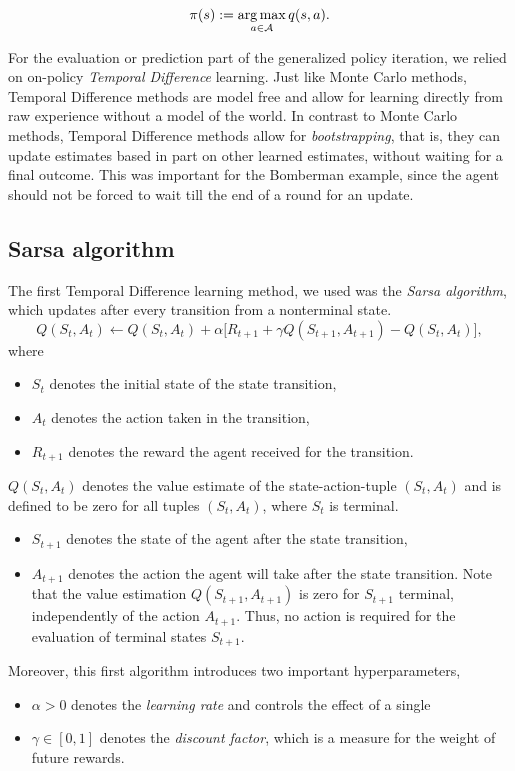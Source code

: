 \begin{equation} \label{eq:greedy_policy_update}
	\pi(s) := \operatorname*{arg\,max}_{a \in \mathcal{A}} q(s, a).
\end{equation}

For the evaluation or prediction part of the generalized policy iteration, we relied on on-policy \emph{Temporal Difference} learning. Just like Monte Carlo methods, Temporal Difference methods are model free and allow for learning directly from raw experience without a model of the world. In contrast to Monte Carlo methods, Temporal Difference methods allow for \emph{bootstrapping}, that is, they can update estimates based in part on other learned estimates, without waiting for a final outcome. This was important for the Bomberman example, since the agent should not be forced to wait till the end of a round for an update.

\subsection{Sarsa algorithm}

The first Temporal Difference learning method, we used was the \emph{Sarsa algorithm}, which updates after every transition from a nonterminal state.  \\
\begin{equation} \label{eq:sarsa_update}
	Q(S_t, A_t) \leftarrow Q(S_t, A_t) + \alpha \big[R_{t+1} + \gamma Q(S_{t+1}, A_{t+1}) - Q(S_t, A_t)\big],
\end{equation}
where
\begin{itemize}
	\item $S_t$ denotes the initial state of the state transition,
	\item $A_t$ denotes the action taken in the transition,
	\item $R_{t+1}$ denotes the reward the agent received for the transition.
\end{itemize}
$Q(S_t, A_t)$ denotes the value estimate of the state-action-tuple $(S_t, A_t)$ and is defined to be zero for all tuples $(S_t, A_t)$, where $S_t$ is terminal.
\begin{itemize}
	\item $S_{t+1}$ denotes the state of the agent after the state transition,
	\item $A_{t+1}$ denotes the action the agent will take after the state transition. Note that the value estimation $Q(S_{t+1}, A_{t+1})$ is zero for $S_{t+1}$ terminal, independently of the action $A_{t+1}$. Thus, no action is required for the evaluation of terminal states $S_{t+1}$. 
\end{itemize}
Moreover, this first algorithm introduces two important hyperparameters,
\begin{itemize}
	\item $\alpha > 0$ denotes the \emph{learning rate} and controls the effect of a single 
	\item $\gamma \in [0, 1]$ denotes the \emph{discount factor}, which is a measure for the weight of future rewards. 
\end{itemize}

